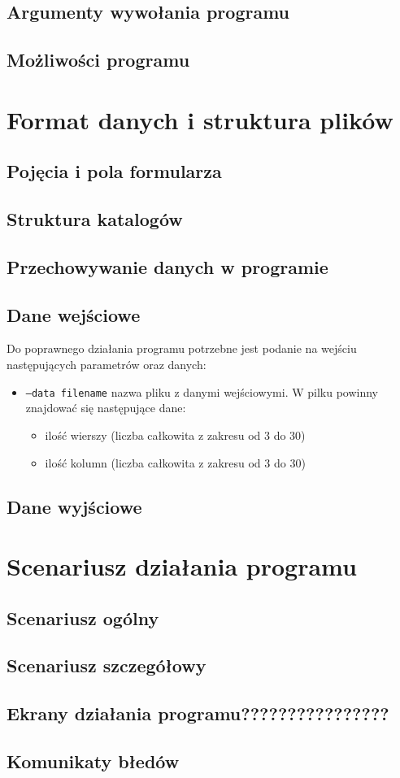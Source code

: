\documentclass{article}
\begin{document}
\subsection{Argumenty wywo\l{}ania programu}
\subsection{Mo\.zliwo\'sci programu}

\section{Format danych i struktura plik\'ow}
\subsection{Poj\k{e}cia i pola formularza}
\subsection{Struktura katalog\'ow}
\subsection{Przechowywanie danych w programie}
\subsection{Dane wej\'sciowe}
Do poprawnego dzia\l{}ania programu potrzebne jest podanie na wej\'sciu nast\k{e}puj\k{a}cych parametr\'ow oraz danych:
\begin{itemize}
	\item \texttt{--data filename} nazwa pliku z danymi wej\'sciowymi. W pilku powinny znajdowa\'c si\k{e} nast\k{e}puj\k{a}ce dane: 
		\begin{itemize}
			\item ilo\'s\'c wierszy (liczba ca\l{}kowita z zakresu od 3 do 30)
			\item ilo\'s\'c kolumn (liczba ca\l{}kowita z zakresu od 3 do 30)
		\end{itemize}
\end{itemize}

\subsection{Dane wyj\'sciowe}

\section{Scenariusz dzia\l{}ania programu}
\subsection{Scenariusz og\'olny}
\subsection{Scenariusz szczeg\'o\l{}owy}
\subsection{Ekrany dzia\l{}ania programu????????????????}
\subsection{Komunikaty b\l{}ed\'ow}
\end{document}
